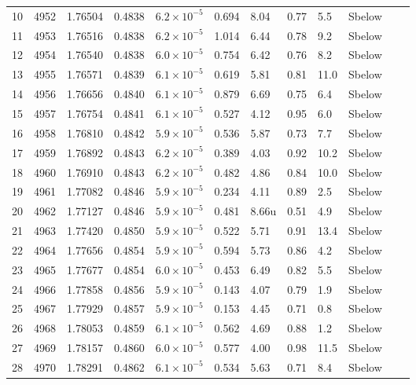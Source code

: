 \begin{longtable}{@{}rrllllllllll@{}}
 10 & 4952 & 1.76504 & 0.4838 & $6.2\times10^{-5}$ & 0.694 & 8.04 & 0.77 & 5.5 & Sbelow &  &  \\
 11 & 4953 & 1.76516 & 0.4838 & $6.2\times10^{-5}$ & 1.014 & 6.44 & 0.78 & 9.2 & Sbelow &  &  \\
 12 & 4954 & 1.76540 & 0.4838 & $6.0\times10^{-5}$ & 0.754 & 6.42 & 0.76 & 8.2 & Sbelow &  &  \\
 13 & 4955 & 1.76571 & 0.4839 & $6.1\times10^{-5}$ & 0.619 & 5.81 & 0.81 & 11.0 & Sbelow &  &  \\
 14 & 4956 & 1.76656 & 0.4840 & $6.1\times10^{-5}$ & 0.879 & 6.69 & 0.75 & 6.4 & Sbelow &  &  \\
 15 & 4957 & 1.76754 & 0.4841 & $6.1\times10^{-5}$ & 0.527 & 4.12 & 0.95 & 6.0 & Sbelow &  &  \\
 16 & 4958 & 1.76810 & 0.4842 & $5.9\times10^{-5}$ & 0.536 & 5.87 & 0.73 & 7.7 & Sbelow &  &  \\
 17 & 4959 & 1.76892 & 0.4843 & $6.2\times10^{-5}$ & 0.389 & 4.03 & 0.92 & 10.2 & Sbelow &  &  \\
 18 & 4960 & 1.76910 & 0.4843 & $6.2\times10^{-5}$ & 0.482 & 4.86 & 0.84 & 10.0 & Sbelow &  &  \\
 19 & 4961 & 1.77082 & 0.4846 & $5.9\times10^{-5}$ & 0.234 & 4.11 & 0.89 & 2.5 & Sbelow &  &  \\
 20 & 4962 & 1.77127 & 0.4846 & $5.9\times10^{-5}$ & 0.481 & 8.66u & 0.51 & 4.9 & Sbelow &  &  \\
 21 & 4963 & 1.77420 & 0.4850 & $5.9\times10^{-5}$ & 0.522 & 5.71 & 0.91 & 13.4 & Sbelow &  &  \\
 22 & 4964 & 1.77656 & 0.4854 & $5.9\times10^{-5}$ & 0.594 & 5.73 & 0.86 & 4.2 & Sbelow &  &  \\
 23 & 4965 & 1.77677 & 0.4854 & $6.0\times10^{-5}$ & 0.453 & 6.49 & 0.82 & 5.5 & Sbelow &  &  \\
 24 & 4966 & 1.77858 & 0.4856 & $5.9\times10^{-5}$ & 0.143 & 4.07 & 0.79 & 1.9 & Sbelow &  &  \\
 25 & 4967 & 1.77929 & 0.4857 & $5.9\times10^{-5}$ & 0.153 & 4.45 & 0.71 & 0.8 & Sbelow &  &  \\
 26 & 4968 & 1.78053 & 0.4859 & $6.1\times10^{-5}$ & 0.562 & 4.69 & 0.88 & 1.2 & Sbelow &  &  \\
 27 & 4969 & 1.78157 & 0.4860 & $6.0\times10^{-5}$ & 0.577 & 4.00 & 0.98 & 11.5 & Sbelow &  &  \\
 28 & 4970 & 1.78291 & 0.4862 & $6.1\times10^{-5}$ & 0.534 & 5.63 & 0.71 & 8.4 & Sbelow &  &  \\

\end{longtable}
